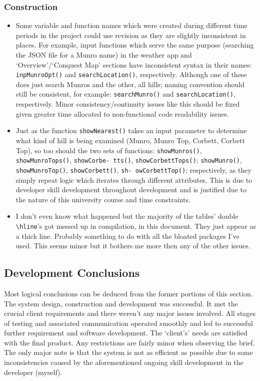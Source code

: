 \documentclass[11pt, english]{article}
\begin{document}
		\subsubsection{Construction}

	\begin{itemize}
	\setlength\itemsep{0cm}
		\item Some variable and function names which were created during different time periods in the project could use revision as they are slightly inconsistent in places. For example, input functions which serve the same purpose (searching the JSON file for a Munro name) in the weather app and `Overview'/`Conquest Map' sections have inconsistent syntax in their names: \texttt{inpMunroOpt()} and \texttt{searchLocation()}, respectively. Although one of these does just search Munros and the other, all hills; naming convention should still be consistent, for example: \texttt{searchMunro()} and \texttt{searchLocation()}, respectively. Minor consistency/continuity issues like this should be fixed given greater time allocated to non-functional code readability issues.
		\item Just as the function \texttt{showNearest()} takes an input parameter to determine what kind of hill is being examined (Munro, Munro Top, Corbett, Corbett Top), so too should the two sets of functions: \texttt{showMunros()}, \texttt{showMunroTops()}, \texttt{showCorbe- tts()}, \texttt{showCorbettTops()}; \texttt{showMunro()}, \texttt{showMunroTop()}, \texttt{showCorbett()}, \texttt{sh- owCorbettTop()}; respectively, as they simply repeat logic which iterates through different attributes. This is due to developer skill development throughout development and is justified due to the nature of this university course and time constraints.
		\item I don't even know what happened but the majority of the tables' double \verb|\hline|'s got messed up in compilation, in this document. They just appear as a thick line. Probably something to do with all the bloated packages I've used. This seems minor but it bothers me more then any of the other issues.
	\end{itemize}

\newpage

	\subsection{Development Conclusions}

	Most logical conclusions can be deduced from the former portions of this section. The system design, construction and development was successful. It met the crucial client requirements and there weren't any major issues involved. All stages of testing and associated communication operated smoothly and led to successful further requirement and software development. The `client's' needs are satisfied with the final product. Any restrictions are fairly minor when observing the brief. The only major note is that the system is not as efficient as possible due to some inconsistencies caused by the aforementioned ongoing skill development in the developer (myself).
\end{document}
